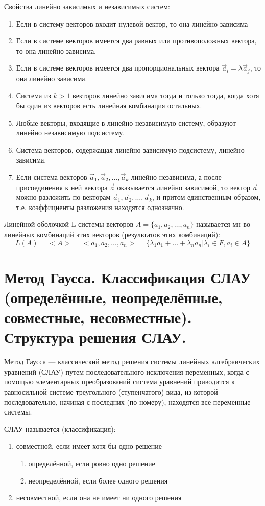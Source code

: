 \documentclass{article}
\begin{document}
Свойства линейно зависимых и независимых систем:
\begin{enumerate}
    \item Если в систему векторов входит нулевой вектор, то она линейно зависима
    \item Если в системе векторов имеется два равных или противоположных вектора, то она линейно зависима.
    \item Если в системе векторов имеется два пропорциональных вектора $\vec{a}_i=\lambda\vec{a}_j$, то она линейно зависима.
    \item Система из $k>1$ векторов линейно зависима тогда и только тогда, когда хотя бы один из векторов есть линейная комбинация остальных.
    \item Любые векторы, входящие в линейно независимую систему, образуют линейно независимую подсистему.
    \item Система векторов, содержащая линейно зависимую подсистему, линейно зависима.
    \item Если система векторов $\vec{a}_1,\vec{a}_2, \ldots, \vec{a}_k$ линейно независима, а после присоединения к ней вектора $\vec{a}$ оказывается линейно зависимой, то вектор $\vec{a}$ можно разложить по векторам $\vec{a}_1,\vec{a}_2,\ldots,\vec{a}_k$, и притом единственным образом, т.е. коэффициенты разложения находятся однозначно.
\end{enumerate}

\textsf{Линейной оболочкой L} системы векторов $A = \{a_1,a_2,\dots,a_n\}$ называется мн-во линейных комбинаций этих векторов (результатов этих комбинаций):
$$L(A)=<A>=<a_1,a_2,\dots,a_n>=\{\lambda_1a_1+\dots+\lambda_na_n | \lambda_i\in F, a_i\in A\}$$

\section{Метод Гаусса. Классификация СЛАУ (определённые, неопределённые, совместные, несовместные). Структура решения СЛАУ.}

\textsf{Метод Гаусса} — классический метод решения системы линейных алгебраических уравнений (СЛАУ) путем последовательного исключения переменных, когда с помощью элементарных преобразований система уравнений приводится к равносильной системе треугольного (ступенчатого) вида, из которой последовательно, начиная с последних (по номеру), находятся все переменные системы.

СЛАУ называется (классификация):
\begin{enumerate}
    \item совместной, если имеет хотя бы одно решение
    \begin{enumerate}
        \item определённой, если ровно одно решение
        \item неопределённой, если более одного решения
    \end{enumerate}
    \item несовместной, если она не имеет ни одного решения
\end{enumerate}
\end{document}
